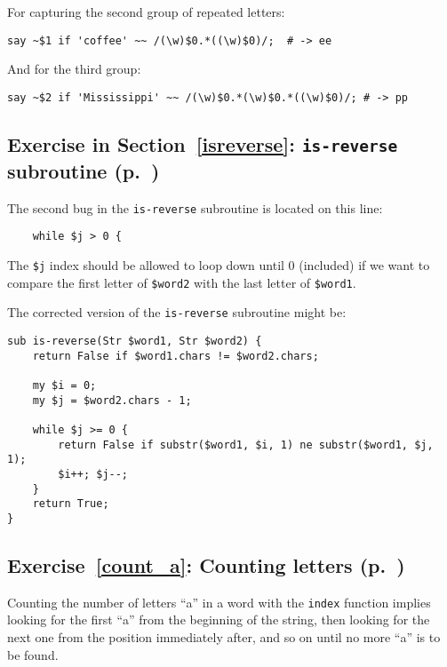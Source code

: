 For capturing the second group of repeated letters:

\begin{verbatim}
say ~$1 if 'coffee' ~~ /(\w)$0.*((\w)$0)/;  # -> ee
\end{verbatim}

And for the third group:

\begin{verbatim}
say ~$2 if 'Mississippi' ~~ /(\w)$0.*(\w)$0.*((\w)$0)/; # -> pp
\end{verbatim}


\subsection{Exercise in Section~\ref{isreverse}: {\tt is-reverse} subroutine (p.~\pageref{isreverse})}
\label{sol_isreverse}

The second bug in the {\tt is-reverse} subroutine is located 
on this line:

\begin{verbatim}
    while $j > 0 {
\end{verbatim}
%

The {\tt \$j} index should be allowed to loop down until 0 
(included) if we want to compare the first letter of 
{\tt \$word2} with the last letter of {\tt \$word1}.

The corrected version of the  {\tt is-reverse} subroutine 
might be:

\begin{verbatim}
sub is-reverse(Str $word1, Str $word2) {
    return False if $word1.chars != $word2.chars;
    
    my $i = 0;
    my $j = $word2.chars - 1;

    while $j >= 0 {
        return False if substr($word1, $i, 1) ne substr($word1, $j, 1);
        $i++; $j--;
    }
    return True;
}
\end{verbatim}
%

\subsection{Exercise~\ref{count_a}: Counting letters (p.~\pageref{count_a})}
\label{sol_count_a}

Counting the number of letters ``a'' in a word with the {\tt index} 
function implies looking for the first ``a'' from the 
beginning of the string, then looking for the next one 
from the position immediately after, and so on until no 
more ``a'' is to be found.

